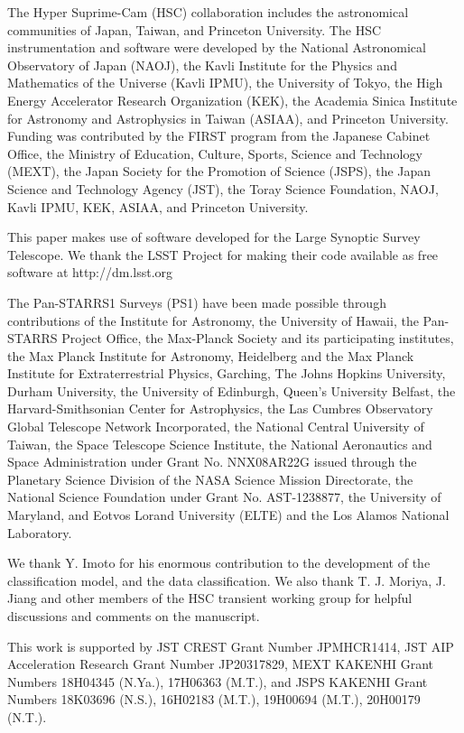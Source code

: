 \documentclass[useamsfonts]{pasj01}
\begin{document}
\begin{ack}
The Hyper Suprime-Cam (HSC) collaboration includes the astronomical communities of Japan, Taiwan, and Princeton University. The HSC instrumentation and software were developed by the National Astronomical Observatory of Japan (NAOJ), the Kavli Institute for the Physics and Mathematics of the Universe (Kavli IPMU), the University of Tokyo, the High Energy Accelerator Research Organization (KEK), the Academia Sinica Institute for Astronomy and Astrophysics in Taiwan (ASIAA), and Princeton University. Funding was contributed by the FIRST program from the Japanese Cabinet Office, the Ministry of Education, Culture, Sports, Science and Technology (MEXT), the Japan Society for the Promotion of Science (JSPS), the Japan Science and Technology Agency (JST), the Toray Science Foundation, NAOJ, Kavli IPMU, KEK, ASIAA, and Princeton University.

This paper makes use of software developed for the Large Synoptic Survey Telescope. We thank the LSST Project for making their code available as free software at  http://dm.lsst.org

The Pan-STARRS1 Surveys (PS1) have been made possible through contributions of the Institute for Astronomy, the University of Hawaii, the Pan-STARRS Project Office, the Max-Planck Society and its participating institutes, the Max Planck Institute for Astronomy, Heidelberg and the Max Planck Institute for Extraterrestrial Physics, Garching, The Johns Hopkins University, Durham University, the University of Edinburgh, Queen’s University Belfast, the Harvard-Smithsonian Center for Astrophysics, the Las Cumbres Observatory Global Telescope Network Incorporated, the National Central University of Taiwan, the Space Telescope Science Institute, the National Aeronautics and Space Administration under Grant No. NNX08AR22G issued through the Planetary Science Division of the NASA Science Mission Directorate, the National Science Foundation under Grant No. AST-1238877, the University of Maryland, and Eotvos Lorand University (ELTE) and the Los Alamos National Laboratory.

We thank Y. Imoto for his enormous contribution to the development of the classification model, and the data classification.
We also thank T. J. Moriya, J. Jiang and other members of the HSC transient working group for helpful discussions and comments on the manuscript.

This work is supported by JST CREST Grant Number JPMHCR1414, JST AIP Acceleration Research Grant Number JP20317829, MEXT KAKENHI Grant Numbers 18H04345 (N.Ya.), 17H06363 (M.T.), and JSPS KAKENHI Grant Numbers 18K03696 (N.S.), 16H02183 (M.T.), 19H00694 (M.T.), 20H00179 (N.T.).


\end{ack}
\end{document}

